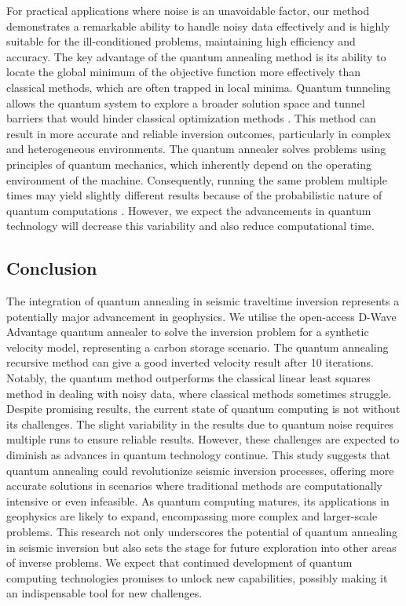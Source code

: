 For practical applications where noise is an unavoidable factor, our method demonstrates a remarkable ability to handle noisy data effectively and is highly suitable for the ill-conditioned problems, maintaining high efficiency and accuracy. The key advantage of the quantum annealing method is its ability to locate the global minimum of the objective function more effectively than classical methods, which are often trapped in local minima. Quantum tunneling allows the quantum system to explore a broader solution space and tunnel barriers that would hinder classical optimization methods \cite{Finnila94}. This method can result in more accurate and reliable inversion outcomes, particularly in complex and heterogeneous environments. The quantum annealer solves problems using principles of quantum mechanics, which inherently depend on the operating environment of the machine. Consequently, running the same problem multiple times may yield slightly different results because of the probabilistic nature of quantum computations \cite{Delgado11, Hevia21}. However, we expect the advancements in quantum technology will decrease this variability and also reduce computational time.

\subsection{Conclusion}

The integration of quantum annealing in seismic traveltime inversion represents a potentially major advancement in geophysics. We utilise the open-access D-Wave Advantage quantum annealer to solve the inversion problem for a synthetic velocity model, representing a carbon storage scenario.
The quantum annealing recursive method can give a good inverted velocity result after 10 iterations. Notably, the quantum method outperforms the classical linear least squares method in dealing with noisy data, where classical methods sometimes struggle. Despite promising results, the current state of quantum computing is not without its challenges. The slight variability in the results due to quantum noise \cite{Li_2020, Franca2021, Leon21} requires multiple runs to ensure reliable results. However, these challenges are expected to diminish as advances in quantum technology continue. This study suggests that quantum annealing could revolutionize seismic inversion processes, offering more accurate solutions in scenarios where traditional methods are computationally intensive or even infeasible. As quantum computing matures, its applications in geophysics are likely to expand, encompassing more complex and larger-scale problems. This research not only underscores the potential of quantum annealing in seismic inversion but also sets the stage for future exploration into other areas of inverse problems. We expect that continued development of quantum computing technologies promises to unlock new capabilities, possibly making it an indispensable tool for new challenges.

